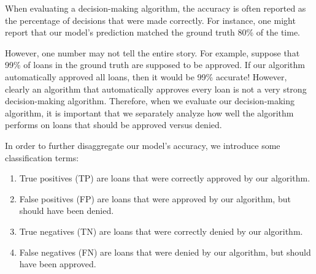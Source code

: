 \par When evaluating a decision-making algorithm, the accuracy is often reported as the percentage of decisions that were made correctly. For instance, one might report that our model’s prediction matched the ground truth 80\% of the time. 
\par However, one number may not tell the entire story. For example, suppose that 99\% of loans in the ground truth are supposed to be approved. If our algorithm automatically approved all loans, then it would be 99\% accurate! However, clearly an algorithm that automatically approves every loan is not a very strong decision-making algorithm. Therefore, when we evaluate our decision-making algorithm, it is important that we separately analyze how well the algorithm performs on loans that should be approved versus denied.
\par In order to further disaggregate our model’s accuracy, we introduce some classification terms:
\begin{enumerate}
\item True positives (TP) are loans that were correctly approved by our algorithm.
\item False positives (FP) are loans that were approved by our algorithm, but should have been denied.
\item True negatives (TN) are loans that were correctly denied by our algorithm.
\item False negatives (FN) are loans that were denied by our algorithm, but should have been approved.
\end{enumerate}

